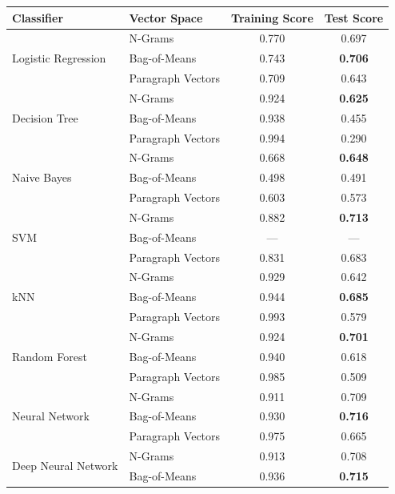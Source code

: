 \begin{table}[h]
  \begin{center}
    \begin{tabular}{ ll cc }
      \toprule
      Classifier & Vector Space & Training Score & Test Score \\
      \midrule
      \multirow{3}{*}{Logistic Regression}
       & N-Grams & 0.770 & 0.697 \\
       & Bag-of-Means & 0.743 & \textbf{0.706} \\
       & Paragraph Vectors & 0.709 & 0.643 \\
      \midrule
      \multirow{3}{*}{Decision Tree}
       & N-Grams & 0.924 & \textbf{0.625} \\
       & Bag-of-Means & 0.938 & 0.455 \\
       & Paragraph Vectors & 0.994 & 0.290 \\
      \midrule
      \multirow{3}{*}{Naive Bayes}
       & N-Grams & 0.668 & \textbf{0.648} \\
       & Bag-of-Means & 0.498 & 0.491 \\
       & Paragraph Vectors & 0.603 & 0.573 \\
      \midrule
      \multirow{3}{*}{SVM}
       & N-Grams & 0.882 & \textbf{0.713} \\
       & Bag-of-Means & --- & --- \\
       & Paragraph Vectors & 0.831 & 0.683 \\
      \midrule
      \multirow{3}{*}{kNN}
       & N-Grams & 0.929 & 0.642 \\
       & Bag-of-Means & 0.944 & \textbf{0.685} \\
       & Paragraph Vectors & 0.993 & 0.579 \\
      \midrule
      \multirow{3}{*}{Random Forest}
       & N-Grams & 0.924 & \textbf{0.701} \\
       & Bag-of-Means & 0.940 & 0.618 \\
       & Paragraph Vectors & 0.985 & 0.509 \\
      \midrule
      \multirow{3}{*}{Neural Network}
       & N-Grams & 0.911 & 0.709 \\
       & Bag-of-Means & 0.930 & \textbf{0.716} \\
       & Paragraph Vectors & 0.975 & 0.665 \\
      \midrule
      \multirow{3}{*}{Deep Neural Network}
       & N-Grams & 0.913 & 0.708 \\
       & Bag-of-Means & 0.936 & \textbf{0.715} \\

\end{tabular}
\end{center}
\end{table}
